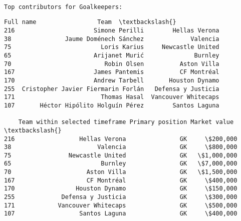 \documentclass[11pt]{article}
\makeatletter
\newcommand{\boxspacing}{\kern\kvtcb@left@rule\kern\kvtcb@boxsep}
\newcommand{\prompt}[4]{
        {\ttfamily\llap{{\color{#2}[#3]:\hspace{3pt}#4}}\vspace{-\baselineskip}}
    }
\makeatother
\begin{document}
    \begin{tcolorbox}[breakable, size=fbox, boxrule=1pt, pad at break*=1mm,colback=cellbackground, colframe=cellborder]
\prompt{In}{incolor}{50}{\boxspacing}
\begin{Verbatim}[commandchars=\\\{\}]

\end{Verbatim}
\end{tcolorbox}

    \begin{Verbatim}[commandchars=\\\{\}]

Top contributors for Goalkeepers:
    \end{Verbatim}

            \begin{tcolorbox}[breakable, size=fbox, boxrule=.5pt, pad at break*=1mm, opacityfill=0]
\prompt{Out}{outcolor}{50}{\boxspacing}
\begin{Verbatim}[commandchars=\\\{\}]
                              Full name                 Team  \textbackslash{}
216                      Simone Perilli        Hellas Verona
38               Jaume Doménech Sánchez             Valencia
75                         Loris Karius     Newcastle United
65                       Arijanet Murić              Burnley
70                          Robin Olsen          Aston Villa
167                      James Pantemis          CF Montréal
170                      Andrew Tarbell       Houston Dynamo
255  Cristopher Javier Fiermarin Forlán   Defensa y Justicia
171                        Thomas Hasal  Vancouver Whitecaps
107       Héctor Hipólito Holguín Pérez        Santos Laguna

    Team within selected timeframe Primary position Market value  \textbackslash{}
216                  Hellas Verona               GK     \$200,000
38                        Valencia               GK     \$800,000
75                Newcastle United               GK   \$1,000,000
65                         Burnley               GK   \$7,000,000
70                     Aston Villa               GK   \$1,500,000
167                    CF Montréal               GK     \$400,000
170                 Houston Dynamo               GK     \$150,000
255             Defensa y Justicia               GK     \$300,000
171            Vancouver Whitecaps               GK     \$500,000
107                  Santos Laguna               GK     \$400,000


\end{Verbatim}
\end{tcolorbox}
\end{document}
